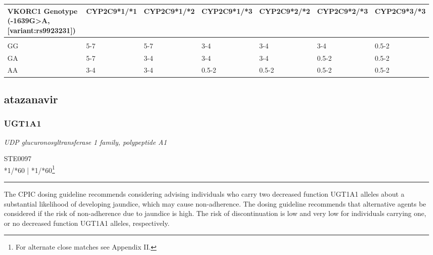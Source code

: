 \documentclass{report}
\begin{document}
      \begin{tabularx}{\textwidth}{ XXXXXXX }
      \textbf{ VKORC1 Genotype (-1639G>A, [variant:rs9923231]) }&\textbf{ CYP2C9*1/*1 }&\textbf{ CYP2C9*1/*2 }&\textbf{ CYP2C9*1/*3 }&\textbf{ CYP2C9*2/*2 }&\textbf{ CYP2C9*2/*3 }&\textbf{ CYP2C9*3/*3} \\ \hline \\  GG & 5-7 & 5-7 & 3-4 & 3-4 & 3-4 & 0.5-2 \\  GA & 5-7 & 3-4 & 3-4 & 3-4 & 0.5-2 & 0.5-2 \\  AA & 3-4  & 3-4 & 0.5-2 & 0.5-2 & 0.5-2 & 0.5-2 \\ 
      \end{tabularx}
      
      \newpage
      \normalsize











\subsection{ atazanavir }

\subsubsection{ UGT1A1 }
     \textit{ UDP glucuronosyltransferase 1 family, polypeptide A1 } \begin{flushright} \textsc{ STE0097 \\ *1/*60  | *1/*60\footnote{For alternate close matches see Appendix II.} }\end{flushright}
      \hrule \vspace{6pt}
      The CPIC dosing guideline recommends considering advising individuals who carry two decreased function UGT1A1 alleles about a substantial likelihood of developing jaundice, which may cause non-adherence. The dosing guideline recommends that alternative agents be considered if the risk of non-adherence due to jaundice is high. The risk of discontinuation is low and very low for individuals carrying one, or no decreased function UGT1A1 alleles, respectively. \newline
      \scriptsize
      
\end{document}
